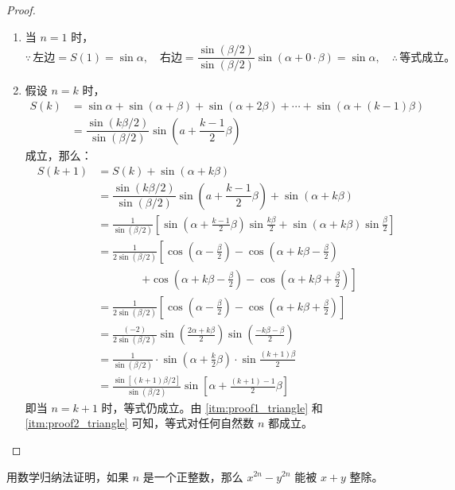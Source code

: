 \begin{proof}
\begin{enumerate}
    \item\label{itm:proof1_triangle} 当 $n=1$ 时，
\[\because\, \text{左边}=S(1)=\sin\alpha,\quad \text{右边}=\dfrac{\sin(\beta/2)}{\sin(\beta/2)}\sin(\alpha+0\cdot \beta)=\sin\alpha, \quad\therefore\, \text{等式成立。}\]

\item\label{itm:proof2_triangle} 假设 $n=k$ 时，
\[\begin{split}
    S(k)&=\sin \alpha+\sin (\alpha+\beta)+\sin (\alpha+2 \beta)+\cdots+\sin (\alpha+(k-1) \beta) \\
&=\dfrac{\sin(k\beta/2)}{\sin(\beta/2)} \sin \left(a+\dfrac{k-1}{2} \beta\right)
\end{split}\]
成立，那么：
\[\begin{split}
    S(k+1)&= S(k)+\sin(\alpha+k\beta)\\
    &=\dfrac{\sin(k \beta/2)}{\sin(\beta/2)} \sin \left(a+\dfrac{k-1}{2} \beta\right)+\sin(\alpha+k\beta)\\
    &=\frac{1}{\sin(\beta/2)}\left[\sin\left(\alpha+\frac{k-1}{2}\beta\right)\sin\frac{k\beta}{2}+\sin(\alpha+k\beta)\sin\frac{\beta}{2}\right]\\
    &=\frac{1}{2\sin(\beta/2)}\left[\cos\left(\alpha-\frac{\beta}{2}\right)-\cos\left(\alpha+k\beta-\frac{\beta}{2}\right)\right. \\
    &\qquad \qquad \left. +\cos\left(\alpha+k\beta -\frac{\beta}{2}\right)-\cos\left(\alpha+k\beta+\frac{\beta}{2}\right)\right]\\
    &=\frac{1}{2\sin(\beta/2)}\left[\cos\left(\alpha-\frac{\beta}{2}\right)-\cos\left(\alpha+k\beta+\frac{\beta}{2}\right)\right]\\
    &= \frac{(-2)}{2\sin(\beta/2)}\sin\left(\frac{2\alpha+k\beta}{2}\right)\sin\left(\frac{-k\beta-\beta}{2}\right)\\
    &=\frac{1}{\sin(\beta/2)}\cdot \sin\left(\alpha+\frac{k}{2}\beta\right)\cdot \sin\frac{(k+1)\beta}{2}\\
    &=\frac{\sin[(k+1)\beta/2]}{\sin(\beta/2)}\sin\left[\alpha+\frac{(k+1)-1}{2}\beta\right]
\end{split}\]
即当 $n=k+1$ 时，等式仍成立。由 \ref{itm:proof1_triangle} 和 \ref{itm:proof2_triangle} 可知，等式对任何自然数 $n$ 都成立。
\end{enumerate}
\end{proof}

\begin{example}
  用数学归纳法证明，如果 $n$ 是一个正整数，那么 $x^{2n}-y^{2n}$ 能被 $x+y$ 整除。
\end{example}

